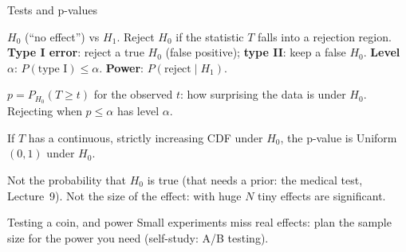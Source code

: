 \documentclass[aspectratio=1610,11pt]{beamer}
\begin{document}
\begin{frame}{Tests and p-values}
    \begin{definition}
        \small $H_0$ (``no effect'') vs $H_1$. Reject $H_0$ if the statistic $T$ falls into a rejection region. \textbf{Type I error}: reject a true $H_0$ (false positive); \textbf{type II}: keep a false $H_0$. \textbf{Level} $\alpha$: $P(\text{type I}) \leq \alpha$. \textbf{Power}: $P(\text{reject} \mid H_1)$.
    \end{definition}
    \begin{definition}
        \small $p = P_{H_0}(T \geq t)$ for the observed $t$: how surprising the data is under $H_0$. Rejecting when $p \leq \alpha$ has level $\alpha$.
    \end{definition}
    \begin{proposition}
        \small If $T$ has a continuous, strictly increasing CDF under $H_0$, the p-value is Uniform$(0, 1)$ under $H_0$.
    \end{proposition}
    \begin{remark}
        \small Not the probability that $H_0$ is true (that needs a prior: the medical test, Lecture~9). Not the size of the effect: with huge $N$ tiny effects are significant.
    \end{remark}
\end{frame}

\begin{frame}{Testing a coin, and power}
    \small Small experiments miss real effects: plan the sample size for the power you need (self-study: A/B testing).
\end{frame}

\end{document}
